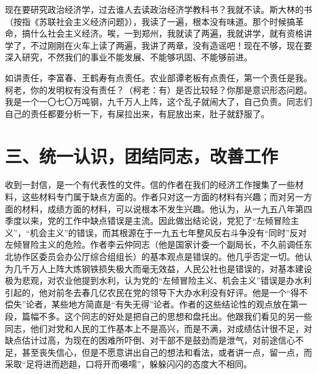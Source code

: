 现在要研究政治经济学，过去谁人去读政治经济学教科书？我就不读。斯大林的书（按指《苏联社会主义经济问题》），我读了一遍，根本没有味道。那个时候搞革命，搞什么社会主义经济。唉，一到郑州，我就读了两遍，我就讲学，就有资格讲学了，不过刚刚在火车上读了两遍，我讲了两章，没有造谣吧！现在不够，现在要深入研究，不然我们的事业不能发展、不能够巩固、不能够前进。

如讲责任，李富春、王鹤寿有点责任。农业部谭老板有点责任，第一个责任是我。柯老，你的发明权有没有责任？（柯老：有）是否比较轻？你那是意识形态问题。我是一个一〇七〇万吨钢，九千万人上阵，这个乱子就闹大了，自己负责。同志们自己的责任都要分析一下，有屎拉出来，有屁放出来，肚子就舒服了。

\date{一九五九年七月二十六}
\section{三、统一认识，团结同志，改善工作}

收到一封信，是一个有代表性的文件。信的作者在我们的经济工作搜集了一些材料，这些材料专门属于缺点方面的。作者只对这一方面的材料有兴趣；而对另一方面的材料，成绩方面的材料，可以说根本不发生兴趣。他认为，从一九五八年第四季度以来，党的工作中缺点错误是主流。因此做出结论说，党犯了“左倾冒险主义”，“机会主义”的错误，而其根源在于一九五七年整风反右斗争没有“同时”反对左倾冒险主义的危险。作者李云仲同志（他是国家计委一个副局长，不久前调任东北协作区委员会办公厅综合组组长）的基本观点是错误的。他几乎否定一切。他认为几千万人上阵大炼钢铁损失极大而毫无效益，人民公社也是错误的，对基本建设极为悲观，对农业他提到水利，认为党的“左倾冒险主义、机会主义”错误是办水利引起的，他对前冬去春几亿农民在党的领导下大办水利没有好评。他是一个“得不偿失”论者，某些地方简直是“有失无得”论者。作者的这些结论性的观点放在第一段，篇幅不多。这个同志的好处是把自己的思想和盘托出。他跟我们看见的另一些同志，他们对党和人民的工作基本上不是高兴，而是不满，对成绩估计很不足，对缺点估计过高，为现在的困难所吓倒、对干部不是鼓劲而是泄气，对前途信心不足，甚至丧失信心，但是不愿意讲出自己的想法和看法，或者讲一点，留一点，而采取“足将进而趔趄，口将开而嗫嚅”，躲躲闪闪的态度大不相同。

